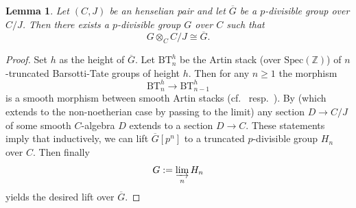 \documentclass{amsart}
\theoremstyle{plain}
\newtheorem{lemma}[theorem]{Lemma}
\theoremstyle{definition}
\newcommand{\Spec}{\mathrm{Spec}}
\newcommand{\Z}{\mathbb{Z}}
\begin{document}
 \begin{lemma}
      \label{sec:fully-faithfulness-p-lifting-p-divisible-groups-along-henselian-pairs} Let $(C,J)$ be an henselian pair and let $\overline{G}$ be a $p$-divisible group over $C/J$. Then there exists a $p$-divisible group $G$ over $C$ such that
      $$
G\otimes_{C} C/J\cong \overline{G}.
      $$
    \end{lemma}
    \begin{proof}
      Set $h$ as the height of $\overline{G}$.
      Let $\mathrm{BT}_n^h$ be the Artin stack (over $\Spec(\Z)$) of $n$-truncated Barsotti-Tate groups of height $h$. Then for any $n\geq 1$ the morphism
      $$
      \mathrm{BT}_n^h\to \mathrm{BT}^h_{n-1}
      $$
      is a smooth morphism between smooth Artin stacks (cf.\ \cite[Section 2]{lau_displays_and_formal_p_divisible_groups} resp.\ \cite[Thm 4.4]{illusie_deformations_de_groupes_de_barsotti_tate}). By \cite[Theorem, page 568]{elkik_solution_d_equation_a_coefficients_dans_un_anneau_henselian} (which extends to the non-noetherian case by passing to the limit) any section $D\to C/J$ of some smooth $C$-algebra $D$ extends to a section $D\to C$.
      These statements imply that inductively, we can lift $\overline{G}[p^n]$ to a truncated $p$-divisible group $H_n$ over $C$. Then finally
      $$
      G:=\varinjlim\limits_n H_n
      $$
      yields the desired lift over $\overline{G}$.
    \end{proof}
\end{document}
